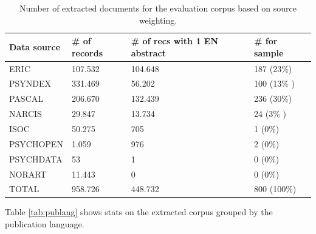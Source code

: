 \documentclass[a4paper,11pt]{article}
\begin{document}
\begin{small}
\begin{table}
\centering
\begin{tabular}{llll}
\toprule
Data source & \# of records & \# of recs with 1 EN abstract & \# for sample \\
\midrule
ERIC 		& 107.532 		& 104.648  & 187 (23\%) \\
PSYNDEX    & 331.469        & 56.202 & 100 (13\% )   \\
PASCAL      & 206.670        & 132.439 & 236 (30\%)           \\
NARCIS      & 29.847         & 13.734  & 24 (3\% )          \\
ISOC        & 50.275         & 705  & 1 (0\%)         \\
PSYCHOPEN   & 1.059          & 976    & 2  (0\%)           \\
PSYCHDATA   & 53            & 1  & 0  (0\%)           \\
NORART      & 11.443         & 0  & 0 (0\%)             \\
\midrule
TOTAL  &  958.726        & 448.732   & 800 (100\%)\\
\bottomrule
\end{tabular}
\caption{Number of extracted documents for the evaluation corpus based on source weighting.}
\label{tab:eval800}
\end{table}
\end{small}

Table \ref{tab:publang} shows stats on the extracted corpus grouped by the publication language. 
\end{document}
